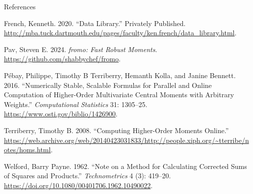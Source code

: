 \documentclass[
  24pt,
  ignorenonframetext,
  aspectratio=43,
]{beamer}
\newlength{\cslhangindent}
\newenvironment{CSLReferences}[2] %
 {\begin{list}{}{%
  \setlength{\itemindent}{0pt}
  \setlength{\leftmargin}{0pt}
  \setlength{\parsep}{0pt}
  \ifodd #1
   \setlength{\leftmargin}{\cslhangindent}
   \setlength{\itemindent}{-1\cslhangindent}
  \fi
  \setlength{\itemsep}{#2\baselineskip}}}
 {\end{list}}
\begin{document}
\begin{frame}{References}
\label{references}
\footnotesize

\label{refs}
\begin{CSLReferences}{1}{0}
French, Kenneth. 2020. {``Data Library.''} Privately Published.
\url{http://mba.tuck.dartmouth.edu/pages/faculty/ken.french/data_library.html}.

Pav, Steven E. 2024. \emph{{fromo}: Fast Robust Moments}.
\url{https://github.com/shabbychef/fromo}.

Pébay, Philippe, Timothy B Terriberry, Hemanth Kolla, and Janine
Bennett. 2016. {``Numerically Stable, Scalable Formulas for Parallel and
Online Computation of Higher-Order Multivariate Central Moments with
Arbitrary Weights.''} \emph{Computational Statistics} 31: 1305--25.
\url{https://www.osti.gov/biblio/1426900}.

Terriberry, Timothy B. 2008. {``Computing Higher-Order Moments
Online.''}
\url{https://web.archive.org/web/20140423031833/http://people.xiph.org/~tterribe/notes/homs.html}.

Welford, Barry Payne. 1962. {``Note on a Method for Calculating
Corrected Sums of Squares and Products.''} \emph{Technometrics} 4 (3):
419--20. \url{https://doi.org/10.1080/00401706.1962.10490022}.

\end{CSLReferences}
\end{frame}
\end{document}
